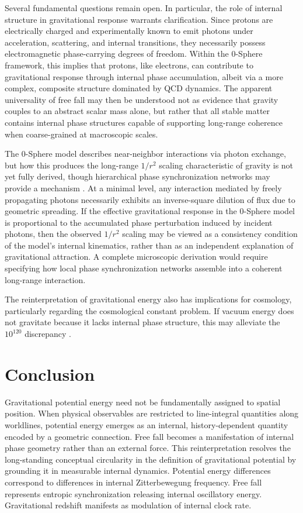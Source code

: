 \documentclass[%
 reprint,
 amsmath,amssymb,
 aps,
 prb,
]{revtex4-2}
\numberwithin{equation}{section}
\begin{document}
Several fundamental questions remain open. In particular, the role of internal structure in gravitational response warrants clarification. Since protons are electrically charged and experimentally known to emit photons under acceleration, scattering, and internal transitions, they necessarily possess electromagnetic phase-carrying degrees of freedom. Within the 0-Sphere framework, this implies that protons, like electrons, can contribute to gravitational response through internal phase accumulation, albeit via a more complex, composite structure dominated by QCD dynamics. The apparent universality of free fall may then be understood not as evidence that gravity couples to an abstract scalar mass alone, but rather that all stable matter contains internal phase structures capable of supporting long-range coherence when coarse-grained at macroscopic scales.

The 0-Sphere model describes near-neighbor interactions via photon exchange, but how this produces the long-range $1/r^2$ scaling characteristic of gravity is not yet fully derived, though hierarchical phase synchronization networks may provide a mechanism \cite{Hanamura2026Geometrical}. At a minimal level, any interaction mediated by freely propagating photons necessarily exhibits an inverse-square dilution of flux due to geometric spreading. If the effective gravitational response in the 0-Sphere model is proportional to the accumulated phase perturbation induced by incident photons, then the observed $1/r^2$ scaling may be viewed as a consistency condition of the model's internal kinematics, rather than as an independent explanation of gravitational attraction. A complete microscopic derivation would require specifying how local phase synchronization networks assemble into a coherent long-range interaction.

The reinterpretation of gravitational energy also has implications for cosmology, particularly regarding the cosmological constant problem. If vacuum energy does not gravitate because it lacks internal phase structure, this may alleviate the $10^{120}$ discrepancy \cite{Hanamura2026Vacuum}.


\section{Conclusion}
\label{sec:conclusion}

Gravitational potential energy need not be fundamentally assigned to spatial position. When physical observables are restricted to line-integral quantities along worldlines, potential energy emerges as an internal, history-dependent quantity encoded by a geometric connection. Free fall becomes a manifestation of internal phase geometry rather than an external force. This reinterpretation resolves the long-standing conceptual circularity in the definition of gravitational potential by grounding it in measurable internal dynamics. Potential energy differences correspond to differences in internal Zitterbewegung frequency. Free fall represents entropic synchronization releasing internal oscillatory energy. Gravitational redshift manifests as modulation of internal clock rate.
\end{document}
